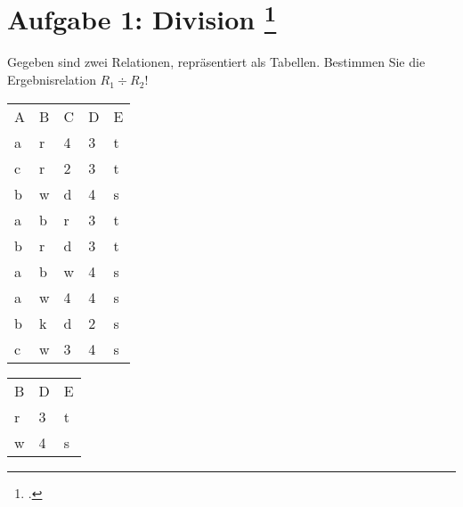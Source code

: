 \documentclass{bschlangaul-aufgabe}
\begin{document}
\def\r#1{\textcolor{red}{#1}}
\def\g#1{\textcolor{green}{#1}}
\def\o#1{\textcolor{orange}{#1}}
\def\b#1{\textcolor{blue}{#1}}


\section{Aufgabe 1: Division
\footcite[Aufgabe 1]{db:ab:4}}

Gegeben sind zwei Relationen, repräsentiert als Tabellen. Bestimmen Sie
die Ergebnisrelation $R_1 \div R_2$!
\begin{multicols}{2}


\begin{tabular}{lllll}
A & B & C & D & E \\
a & r & 4 & 3 & t \\
c & r & 2 & 3 & t \\%
b & w & d & 4 & s \\
a & b & r & 3 & t \\
b & r & d & 3 & t \\
a & b & w & 4 & s \\
a & w & 4 & 4 & s \\%
b & k & d & 2 & s \\
c & w & 3 & 4 & s
\end{tabular}


\begin{tabular}{lll}
B & D & E \\
r & 3 & t \\
w & 4 & s
\end{tabular}
\end{multicols}
\end{document}
